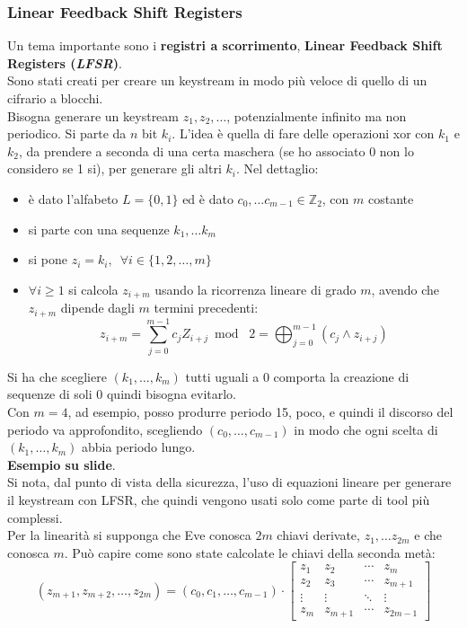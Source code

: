 \documentclass[a4paper,12pt, oneside]{book}
\begin{document}
\subsubsection{Linear Feedback Shift Registers}
Un tema importante sono i \textbf{registri a scorrimento}, \textbf{Linear
  Feedback Shift Registers (\textit{LFSR})}.\\
Sono stati creati per creare un keystream in modo più veloce di quello di un
cifrario a blocchi.\\
Bisogna generare un keystream $z_1,z_2,\ldots$, potenzialmente infinito ma non
periodico. Si parte da $n$ bit $k_i$. L'idea è quella di fare delle operazioni
xor con $k_1$ e $k_2$, da prendere a seconda di una certa maschera (se ho
associato 0 non lo considero se 1 si), per generare
gli altri $k_i$. Nel dettaglio:
\begin{itemize}
  \item è dato l'alfabeto $L=\{0,1\}$ ed è dato $c_0,\ldots
  c_{m-1}\in\mathbb{Z}_2$, con $m$ costante
  \item si parte con una sequenze $k_1,\ldots k_m$
  \item si pone $z_i=k_i,\,\,\,\forall i\in\{1,2,\ldots,m\}$ 
  \item $\forall i\geq 1$ si calcola $z_{i+m}$ usando la ricorrenza lineare di
  grado $m$, avendo che $z_{i+m}$ dipende dagli $m$ termini precedenti:
  \[z_{i+m}=\sum_{j=0}^{m-1}c_jZ_{i+j}\bmod\,\,2=\bigoplus_{j=0}^{m-1}(c_j\land
    z_{i+j})\] 
\end{itemize}
Si ha che scegliere $(k_1,\ldots,k_m)$ tutti uguali a 0 comporta la creazione di
sequenze di soli 0 quindi bisogna evitarlo.\\
Con $m=4$, ad esempio, posso produrre periodo 15, poco, e quindi il discorso del
periodo va approfondito, scegliendo $(c_0,\ldots,c_{m-1})$ in modo che ogni scelta
di $(k_1,\ldots,k_m)$ abbia periodo lungo.\\
\textbf{Esempio su slide}.\\
Si nota, dal punto di vista della sicurezza, l'uso di equazioni lineare per
generare il keystream con LFSR, che quindi vengono usati solo come parte di
tool più complessi. \\
Per la linearità si supponga che Eve conosca $2m$ chiavi derivate, $z_1,\ldots
z_{2m}$ e che conosca $m$. Può capire come sono state calcolate le chiavi della
seconda metà:
\[(z_{m+1},z_{m+2},\ldots, z_{2m})=(c_0,c_1,\ldots,c_{m-1})\cdot
  \left[
    \begin{matrix}
      z_1 & z_2 &\cdots &z_m\\
      z_2 & z_3 &\cdots &z_{m+1}\\
      \vdots & \vdots &\ddots &\vdots\\
      z_m & z_{m+1} &\cdots &z_{2m-1}
    \end{matrix}
  \right]
\]
\end{document}
